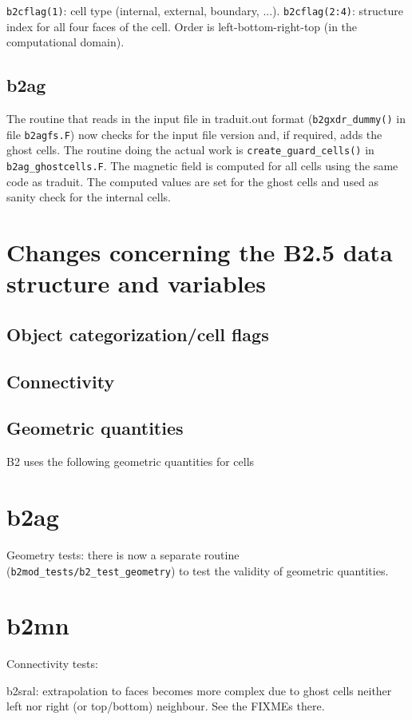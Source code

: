 \documentclass[10pt,a4paper]{report}
\begin{document}
\verb+b2cflag(1)+: cell type (internal, external, boundary, ...). 
\verb+b2cflag(2:4)+: structure index for all four faces of the cell. Order is left-bottom-right-top (in the computational domain).

\subsection{b2ag}

The routine that reads in the input file in traduit.out format (\verb+b2gxdr_dummy()+ in file \verb+b2agfs.F+) now checks for the input file version and, if required, adds the ghost cells. The routine doing the actual work is \verb+create_guard_cells()+ in \verb+b2ag_ghostcells.F+. The magnetic field is computed for all cells using the same code as traduit. The computed values
are set for the ghost cells and used as sanity check for the internal cells.

\section{Changes concerning the B2.5 data structure and variables}

\subsection{Object categorization/cell flags}

\subsection{Connectivity}

\subsection{Geometric quantities}

B2 uses the following geometric quantities for cells



\section{b2ag}

Geometry tests: there is now a separate routine (\verb+b2mod_tests/b2_test_geometry+) to test the validity of geometric quantities.


\section{b2mn}

Connectivity tests:

b2sral: extrapolation to faces becomes more complex due to ghost cells neither left nor right (or top/bottom) neighbour. 
See the FIXMEs there.
\end{document}
